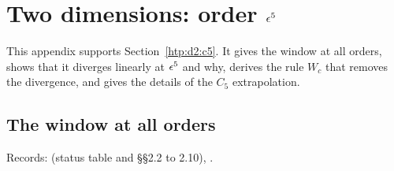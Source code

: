 \section{Two dimensions: order \texorpdfstring{$\epsilon^5$}{eps5}}\label{htp:d2:app:eps5}

This appendix supports Section~\ref{htp:d2:c5}. It gives the window at all orders, shows that it diverges linearly at
$\epsilon^5$ and why, derives the rule $W_c$ that removes the divergence, and gives the details of the $C_5$ extrapolation.

\subsection{The window at all orders}\label{htp:d2:app:Wall}
{\small\raggedright\noindent Records:  (status table and \S\S2.2 to 2.10),
.\par}

